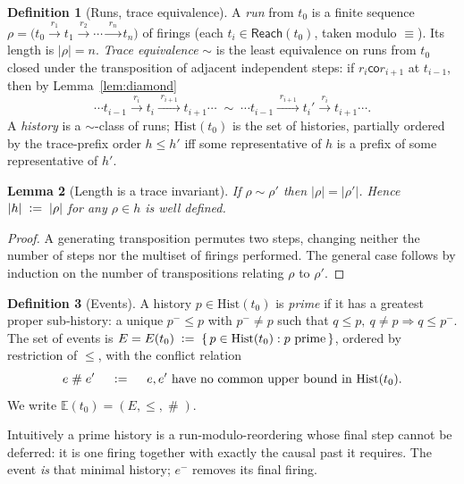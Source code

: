 \documentclass[11pt]{article}
\theoremstyle{definition}
\newtheorem{definition}{Definition}[section]
\theoremstyle{plain}
\newtheorem{lemma}[definition]{Lemma}
\newcommand{\Seq}{\equiv}
\newcommand{\fire}[1]{\xrightarrow{\;#1\;}}
\newcommand{\Hist}{\mathrm{Hist}}
\newcommand{\Ev}{\mathbb{E}}
\newcommand{\Evt}{E}
\newcommand{\co}{\mathbin{\mathsf{co}}}            %
\newcommand{\confl}{\mathrel{\#}}                  %
\newcommand{\reach}{\mathsf{Reach}}
\newcommand{\defeq}{\;\mathrel{\vcentcolon=}\;}
\theoremstyle{remark}
\begin{document}
\begin{definition}[Runs, trace equivalence]
\label{def:runs}
A \emph{run} from $t_0$ is a finite sequence
$\rho = \bigl(t_0 \fire{r_1} t_1 \fire{r_2} \cdots \fire{r_n} t_n\bigr)$
of firings (each $t_i \in \reach(t_0)$, taken modulo $\Seq$). Its length
is $|\rho|=n$. \emph{Trace equivalence} $\sim$ is the least equivalence
on runs from $t_0$ closed under the transposition of adjacent
independent steps: if $r_i \co r_{i+1}$ at $t_{i-1}$, then by
Lemma~\ref{lem:diamond}
\[
  \cdots t_{i-1} \fire{r_i} t_i \fire{r_{i+1}} t_{i+1} \cdots
  \;\sim\;
  \cdots t_{i-1} \fire{r_{i+1}} t_i' \fire{r_i} t_{i+1} \cdots .
\]
A \emph{history} is a $\sim$-class of runs; $\Hist(t_0)$ is the set of
histories, partially ordered by the trace-prefix order
$h \le h'$ iff some representative of $h$ is a prefix of some
representative of $h'$.
\end{definition}

\begin{lemma}[Length is a trace invariant]
\label{lem:length}
If $\rho \sim \rho'$ then $|\rho| = |\rho'|$. Hence $|h| \defeq |\rho|$
for any $\rho \in h$ is well defined.
\end{lemma}

\begin{proof}
A generating transposition permutes two steps, changing neither the
number of steps nor the multiset of firings performed. The general case
follows by induction on the number of transpositions relating $\rho$ to
$\rho'$.
\end{proof}

\begin{definition}[Events]
\label{def:events}
A history $p \in \Hist(t_0)$ is \emph{prime} if it has a greatest proper
sub-history: a unique $p^- \le p$ with $p^- \neq p$ such that
$q \le p,\ q \neq p \Rightarrow q \le p^-$. The set of events is
$\Evt = \Evt(t_0) \defeq \{\,p \in \Hist(t_0) : p \text{ prime}\,\}$,
ordered by restriction of $\le$, with the conflict relation
\[
  e \confl e'
  \quad\defeq\quad
  e, e' \text{ have no common upper bound in } \Hist(t_0).
\]
We write $\Ev(t_0) = (\Evt, \le, \confl)$.
\end{definition}

Intuitively a prime history is a run-modulo-reordering whose final step
cannot be deferred: it is one firing together with exactly the causal
past it requires. The event \emph{is} that minimal history; $e^-$ removes
its final firing.
\end{document}
